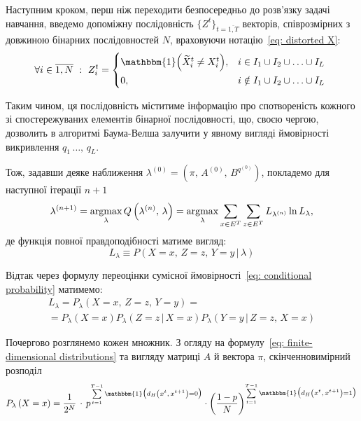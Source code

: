 Наступним кроком, перш ніж переходити безпосередньо до розв'язку задачі навчання, введемо допоміжну послідовність $\{ Z^t \}_{t=\overline{1,T}}$ векторів, співрозмірних з довжиною бінарних послідовностей $N$, враховуючи нотацію~\eqref{eq: distorted X}:
\begin{equation*}
    \forall i \in \overline{1,N}\ :\ Z^t_i =
    \begin{cases*}
        \mathbbm{1} \Bigl( \widetilde{X}^t_i \neq X^t_i \Bigr), & $i \in I_1 \cup I_2 \cup \ldots \cup I_L$ \\
        0, & $i \notin I_1 \cup I_2 \cup \ldots \cup I_L$ \\
    \end{cases*}
\end{equation*}

Таким чином, ця послідовність міститиме інформацію про спотвореність кожного зі спостережуваних елементів бінарної послідовності, що, своєю чергою, дозволить в алгоритмі Баума-Велша залучити у явному вигляді ймовірності викривлення $q_1\,\ldots,\,q_L$.

Тож, задавши деяке наближення $\lambda^{(0)}=(\pi,\,A^{(0)},\,B^{q^{(0)}})$, покладемо для наступної ітерації $n+1$
\begin{equation*}
    \lambda^{(n+1)} = \operatorname*{argmax}\limits_{\lambda} Q\left( \lambda^{(n)},\,\lambda \right) = \operatorname*{argmax}\limits_{\lambda} \sum\limits_{x \in E^T} \sum\limits_{z \in E^T} L_{\lambda^{(n)}} \ln L_{\lambda},
\end{equation*}
де функція повної правдоподібності матиме вигляд:
\begin{equation*}
    L_{\lambda} \equiv P\left( X=x,\,Z=z,\,Y=y \,|\, \lambda \right)
\end{equation*}

Відтак через формулу переоцінки сумісної ймовірності~\eqref{eq: conditional probability} матимемо:
\begin{multline*}
    L_{\lambda} = P_\lambda \left( X=x,\,Z=z,\,Y=y \right) = \\ 
    = P_\lambda \left( X=x \right) P_\lambda \left( Z=z \,|\, X=x \right) P_\lambda \left( Y=y \,|\, Z=z,\,X=x \right)
\end{multline*}

Почергово розглянемо кожен множник. З огляду на формулу~\eqref{eq: finite-dimensional distributions} та вигляду матриці $A$ й вектора $\pi$, скінченновимірний розподіл
\begin{equation*}
    P_\lambda \left( X=x \right) = \frac{1}{2^N}\, \cdot\, p^{\sum\limits_{t=1}^{T-1} \mathbbm{1} \bigl( d_H\left( x^t,\,x^{t+1} \right) = 0 \bigr)} \cdot \left(\frac{1-p}{N}\right)^{\sum\limits_{t=1}^{T-1} \mathbbm{1} \bigl( d_H\left( x^t,\,x^{t+1} \right) = 1 \bigr)}
\end{equation*}

